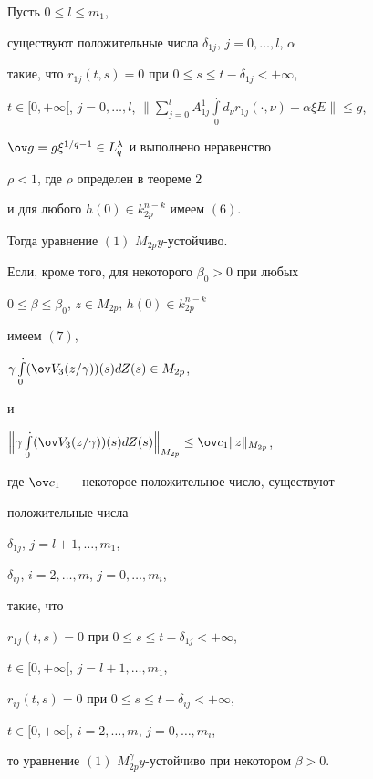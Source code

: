 \begin{thm}


Пусть $0 \le l \le m_1$, 


существуют положительные числа $\delta_{1j}$, $j = 0,\dotsc, l$, $\alpha$ 


такие, что $r_{1j}(t,s) = 0$ при $0 \le s \le t - \delta_{1j} < +\infty$, 


$t \in [0, +\infty [$, $j = 0,\dotsc, l$, $\Big\|\sum \limits_{j=0}^l


A_{1j}^1\int \limits_0^{\displaystyle .}


d_\nu r_{1j}(\cdot,\nu ) + \alpha \xi E\Big\| \le g$, 


$\ov g = g\xi^{1/q-1} \in L_q^\lambda $ и выполнено неравенство


$\rho < 1$, где $\rho $ определен в теореме $2$


и для любого $h(0) \in k_{2p}^{n-k}$ имеем $(6)$.


Тогда уравнение $(1)$ $M_{2p}y$-устойчиво. 


Если, кроме того, для некоторого $\beta_0 > 0$ при любых 


$0 \le \beta \le \beta_0$, $z \in M_{2p}$, $h(0) \in k_{2p}^{n-k}$ 


имеем $(7)$,


$\gamma\int\limits_0^{\displaystyle .}(\ov V_3(z/\gamma))(s)dZ(s)\in M_{2p}$, 


и


$\Big\|\gamma\int\limits_0^{\displaystyle .}


(\ov V_3(z/\gamma ))(s)dZ(s)\Big\|_{M_{2p}} \le 


\ov c_1\|z\|_{M_{2p}}$, 


где $\ov c_1$ --- некоторое положительное число, существуют 


положительные числа 


$\delta_{1j}$, $j = l + 1,\dotsc, m_1$, 


$\delta_{ij}$, $i = 2,\dotsc, m$, $j = 0,\dotsc, m_i$, 


такие, что 


$r_{1j}(t,s) = 0$ при $0 \le s \le t - \delta_{1j} < + \infty$, 


$t \in [0, +\infty [$, $j = l + 1,\dotsc, m_1$, 


$r_{ij}(t,s) = 0$ при $0 \le s \le t - \delta_{ij} < + \infty$, 


$t \in [0, +\infty [$, $i = 2,\dotsc, m$, $j = 0,\dotsc, m_i$, 


то уравнение $(1)$ $M_{2p}^\gamma y$-устойчиво при некотором $\beta > 0$.


\end{thm}





